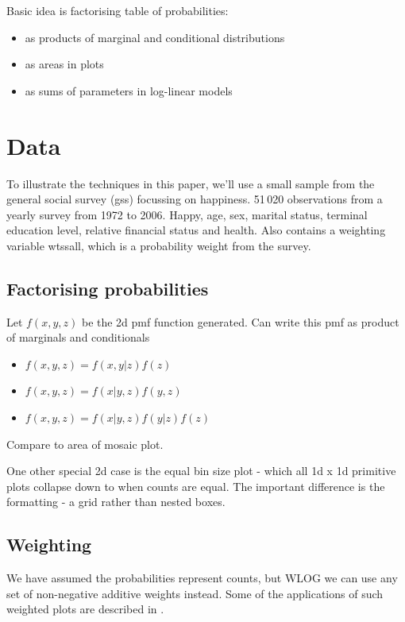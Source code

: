 \documentclass[letterpaper,oneside]{scrartcl}
\begin{document}
Basic idea is factorising table of probabilities:

\begin{itemize}
  \item as products of marginal and conditional distributions
  \item as areas in plots
  \item as sums of parameters in log-linear models
\end{itemize}


\section{Data}
\label{sec:data}

To illustrate the techniques in this paper, we'll use a small sample from the general social survey ({\sc gss}) focussing on happiness.  51\,020 observations from a yearly survey from 1972 to 2006.  Happy, age, sex, marital status, terminal education level, relative financial status and health.  Also contains a weighting variable wtssall, which is a probability weight from the survey.

\subsection{Factorising probabilities}

Let $f(x, y, z)$ be the 2d pmf function generated.  Can write this pmf as product of marginals and conditionals

\begin{itemize}
  \item $f(x, y, z) = f(x, y | z) f(z)$
  \item $f(x, y, z) = f(x | y, z) f(y, z)$
  \item $f(x, y, z) = f(x | y, z) f(y | z) f(z)$
\end{itemize}

Compare to area of mosaic plot.

One other special 2d case is the equal bin size plot - which all 1d x 1d primitive plots collapse down to when counts are equal.  The important difference is the formatting - a grid rather than nested boxes.

\subsection{Weighting}
\label{sub:weighting}

We have assumed the probabilities represent counts, but WLOG we can use any set of non-negative additive weights instead.  Some of the applications of such weighted plots are described in \citet{unwin:2007}.
\end{document}
